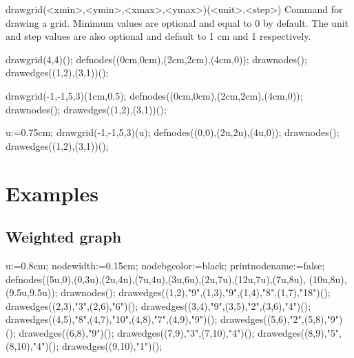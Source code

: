 \documentclass[11pt,a4paper,english]{article}
\begin{document}
\begin{rplabel}{drawgrid(<xmin>,<ymin>,<xmax>,<ymax>)(<unit>,<step>)}
Command for drawing a grid. Minimum values are optional and equal to 0 by default. The unit and step values are also optional and default to 1 cm and 1 respectively.
\end{rplabel}

\begin{exemple}[lefthand ratio = 0.6]
drawgrid(4,4)();
defnodes((0cm,0cm),(2cm,2cm),(4cm,0));
drawnodes();
drawedges((1,2),(3,1))();
\end{exemple}

\begin{exemple}[lefthand ratio = 0.6]
drawgrid(-1,-1,5,3)(1cm,0.5);
defnodes((0cm,0cm),(2cm,2cm),(4cm,0));
drawnodes();
drawedges((1,2),(3,1))();
\end{exemple}

\begin{exemple}[lefthand ratio = 0.6]
u:=0.75cm;
drawgrid(-1,-1,5,3)(u);
defnodes((0,0),(2u,2u),(4u,0));
drawnodes();
drawedges((1,2),(3,1))();
\end{exemple}


\section{Examples}

\subsection*{Weighted graph}
\begin{exemple}
u:=0.8cm;
nodewidth:=0.15cm;
nodebgcolor:=black;
printnodename:=false;
defnodes((5u,0),(0,3u),(2u,4u),(7u,4u),(3u,6u),(2u,7u),(12u,7u),(7u,8u),
                                                                   (10u,8u),(9.5u,9.5u));
drawnodes();
drawedges((1,2),"9",(1,3),"9",(1,4),"8",(1,7),"18")();
drawedges((2,3),"3",(2,6),"6")();
drawedges((3,4),"9",(3,5),"2",(3,6),"4")();
drawedges((4,5),"8",(4,7),"10",(4,8),"7",(4,9),"9")();
drawedges((5,6),"2",(5,8),"9")();
drawedges((6,8),"9")();
drawedges((7,9),"3",(7,10),"4")();
drawedges((8,9),"5",(8,10),"4")();
drawedges((9,10),"1")();
\end{exemple}
\end{document}

